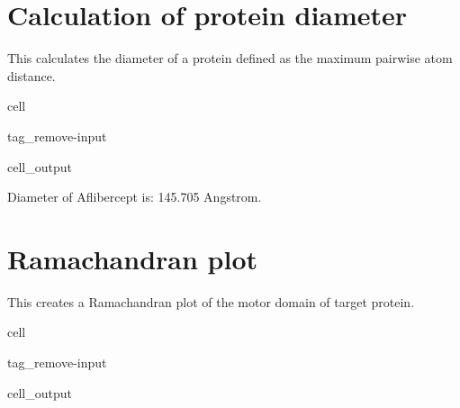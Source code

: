 \documentclass[letterpaper,10pt,english]{jupyterBook}
\begin{document}
\section{Calculation of protein diameter}
\label{\detokenize{ipynb/chapter3:calculation-of-protein-diameter}}
\sphinxAtStartPar
This calculates the diameter of a protein defined as the maximum pairwise atom distance.

\begin{sphinxuseclass}{cell}
\begin{sphinxuseclass}{tag_remove-input}\begin{sphinxVerbatimOutput}

\begin{sphinxuseclass}{cell_output}
\begin{sphinxVerbatim}[commandchars=\\\{\}]
Diameter of Aflibercept is: 145.705 Angstrom.
\end{sphinxVerbatim}

\end{sphinxuseclass}\end{sphinxVerbatimOutput}

\end{sphinxuseclass}
\end{sphinxuseclass}

\section{Ramachandran plot}
\label{\detokenize{ipynb/chapter3:ramachandran-plot}}
\sphinxAtStartPar
This creates a Ramachandran plot of the motor domain of target protein.

\begin{sphinxuseclass}{cell}
\begin{sphinxuseclass}{tag_remove-input}\begin{sphinxVerbatimOutput}

\begin{sphinxuseclass}{cell_output}
\noindent{}

\end{sphinxuseclass}\end{sphinxVerbatimOutput}

\end{sphinxuseclass}
\end{sphinxuseclass}
\sphinxstepscope
\end{document}
